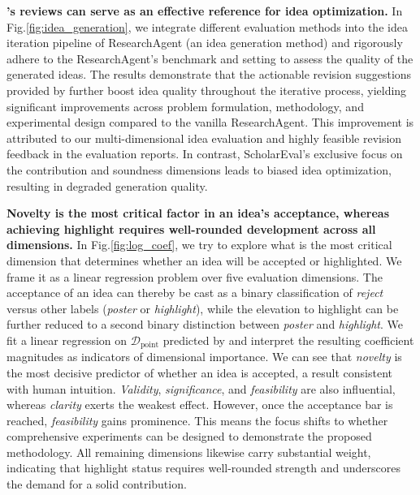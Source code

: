 \textbf{{\ours}'s reviews can serve as an effective reference for idea optimization.}
In Fig.\ref{fig:idea_generation}, we integrate different evaluation methods into the idea iteration pipeline of ResearchAgent (an idea generation method) and rigorously adhere to the ResearchAgent's benchmark and setting to assess the quality of the generated ideas.
The results demonstrate that the actionable revision suggestions provided by {\ours} further boost idea quality throughout the iterative process, yielding significant improvements across problem formulation, methodology, and experimental design compared to the vanilla ResearchAgent.
This improvement is attributed to our multi-dimensional idea evaluation and highly feasible revision feedback in the evaluation reports.
In contrast, ScholarEval's exclusive focus on the contribution and soundness dimensions leads to biased idea optimization, resulting in degraded generation quality.

\textbf{Novelty is the most critical factor in an idea's acceptance, whereas achieving highlight requires well-rounded development across all dimensions.}
In Fig.\ref{fig:log_coef}, we try to explore what is the most critical dimension that determines whether an idea will be accepted or highlighted.
We frame it as a linear regression problem over five evaluation dimensions.
The acceptance of an idea can thereby be cast as a binary classification of \textit{reject} versus other labels (\textit{poster} or \textit{highlight}), while the elevation to highlight can be further reduced to a second binary distinction between \textit{poster} and \textit{highlight}.
We fit a linear regression on $\boldsymbol{\mathcal{D}}_\textrm{point}$ predicted by {\ours} and interpret the resulting coefficient magnitudes as indicators of dimensional importance.
We can see that \textit{novelty} is the most decisive predictor of whether an idea is accepted, a result consistent with human intuition.
\textit{Validity}, \textit{significance}, and \textit{feasibility} are also influential, whereas \textit{clarity} exerts the weakest effect.
However, once the acceptance bar is reached, \textit{feasibility} gains prominence.
This means the focus shifts to whether comprehensive experiments can be designed to demonstrate the proposed methodology.
All remaining dimensions likewise carry substantial weight, indicating that highlight status requires well-rounded strength and underscores the demand for a solid contribution.

